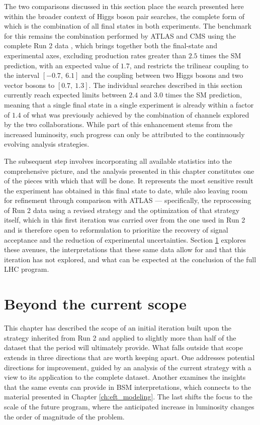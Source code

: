 The two comparisons discussed in this section place the search presented here within the broader context of Higgs boson pair searches, the complete form of which is the combination of all final states in both experiments. The benchmark for this remains the combination performed by ATLAS and CMS using the complete Run 2 data \cite{ATLASCMS:2026HH}, which brings together both the final-state and experimental axes, excluding production rates greater than $2.5$ times the SM prediction, with an expected value of $1.7$, and restricts the trilinear coupling to the interval $[-0.7,\ 6.1]$ and the coupling between two Higgs bosons and two vector bosons to $[0.7,\ 1.3]$. The individual searches described in this section currently reach expected limits between $2.4$ and $3.0$ times the SM prediction, meaning that a single final state in a single experiment is already within a factor of $1.4$ of what was previously achieved by the combination of channels explored by the two collaborations. While part of this enhancement stems from the increased luminosity, such progress can only be attributed to the continuously evolving analysis strategies.

The subsequent step involves incorporating all available statistics into the comprehensive picture, and the analysis presented in this chapter constitutes one of the pieces with which that will be done. It represents the most sensitive result the experiment has obtained in this final state to date, while also leaving room for refinement through comparison with ATLAS — specifically, the reprocessing of Run 2 data using a revised strategy and the optimization of that strategy itself, which in this first iteration was carried over from the one used in Run 2 and is therefore open to reformulation to prioritize the recovery of signal acceptance and the reduction of experimental uncertainties. Section \ref{sec:bbtt_prospects} explores these avenues, the interpretations that these same data allow for and that this iteration has not explored, and what can be expected at the conclusion of the full LHC program.



\section{Beyond the current scope}
\label{sec:bbtt_prospects}
%
This chapter has described the scope of an initial iteration built upon the strategy inherited from Run 2 and applied to slightly more than half of the dataset that the period will ultimately provide. What falls outside that scope extends in three directions that are worth keeping apart. One addresses potential directions for improvement, guided by an analysis of the current strategy with a view to its application to the complete dataset. Another examines the insights that the same events can provide in BSM interpretations, which connects to the material presented in Chapter \ref{ch:eft_modeling}. The last shifts the focus to the scale of the future program, where the anticipated increase in luminosity changes the order of magnitude of the problem.



